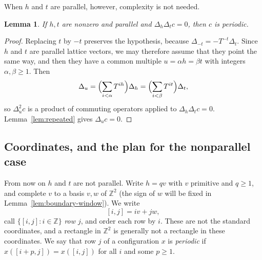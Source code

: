 \documentclass[11pt,a4paper,reqno]{amsart}
\newtheorem{lemma}[theorem]{Lemma}
\theoremstyle{definition}
\theoremstyle{remark}
\newcommand{\Z}{\mathbb Z}
\newcommand{\De}{\Delta}
\newcommand{\rc}[2]{[#1,#2]}
\numberwithin{equation}{section}
\begin{document}
When $h$ and $t$ are parallel, however, complexity is not needed.

\begin{lemma}\label{lem:parallel}
If $h,t$ are nonzero and parallel and $\De_h\De_tc=0$, then $c$ is periodic.
\end{lemma}

\begin{proof}
Replacing $t$ by $-t$ preserves the hypothesis, because $\De_{-t}=-T^{-t}\De_t$. Since $h$ and $t$ are parallel lattice vectors, we may therefore assume that they point the same way, and then they have a common multiple $u=\alpha h=\beta t$ with integers $\alpha,\beta\ge1$. Then
\[
 \De_u=\Bigl(\sum_{i<\alpha}T^{ih}\Bigr)\De_h=\Bigl(\sum_{i<\beta}T^{it}\Bigr)\De_t,
\]
so $\De_u^2c$ is a product of commuting operators applied to $\De_h\De_tc=0$. Lemma~\ref{lem:repeated} gives $\De_uc=0$.
\end{proof}

\subsection{Coordinates, and the plan for the nonparallel case}\label{ssec:plan}
From now on $h$ and $t$ are not parallel. Write $h=qv$ with $v$ primitive and $q\ge1$, and complete $v$ to a basis $v,w$ of $\Z^2$ (the sign of $w$ will be fixed in Lemma~\ref{lem:boundary-window}). We write
\[
 \rc ij=iv+jw,
\]
call $\{\rc ij:i\in\Z\}$ \emph{row $j$}, and order each row by $i$. These are not the standard coordinates, and a rectangle in $\Z^2$ is generally not a rectangle in these coordinates. We say that row $j$ of a configuration $x$ is \emph{periodic} if $x(\rc{i+p}j)=x(\rc ij)$ for all $i$ and some $p\ge1$.
\end{document}
